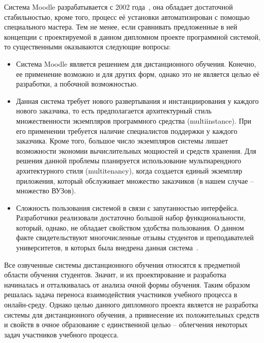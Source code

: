 Система Moodle разрабатывается с 2002 года~\cite{moodle_habr}, она обладает достаточной стабильностью, кроме того, процесс её установки автоматизирован с помощью специального мастера. Тем не менее, если сравнивать предложенные в ней концепции с проектируемой в данном дипломном проекте программной системой, то существенными оказываются следующие вопросы:
\begin{itemize}
	\item Система Moodle является решением для дистанционного обучения. Конечно, ее применение возможно и для других форм, однако это не является целью её разработки, а побочной возможностью.
	\item Данная система требует нового развертывания и инстанциирования у каждого нового заказчика, то есть предполагается архитектурный стиль множественности экземпляров программного средства (multiinstance). При его применении требуется наличие специалистов поддержки у каждого заказчика. Кроме того, большое число экземпляров системы лишает возможности экономии вычислительных мощностей и средств хранения. Для решения данной проблемы планируется использование мультиарендного архитектурного стиля (mul\-ti\-te\-nan\-cy), когда создается единый экземпляр приложения, который обслуживает множество заказчиков (в нашем случае -- множество \mbox{ВУЗов}).
	\item Сложность пользования системой в связи с запутанностью интерфейса. Разработчики реализовали достаточно большой набор функциональности, который, однако, не обладает свойством удобства пользования. О данном факте свидетельствуют многочисленные отзывы студентов и преподавателей университетов, в которых была внедрена данная система~\cite{moodle_habr}.
\end{itemize}

Все озвученные системы дистанционного обучения относятся к предметной области обучения студентов. Значит, и их проектирование и разработка начиналась и отталкивалась от анализа очной формы обучения. Таким образом решалась задача переноса взаимодействия участников учебного процесса в онлайн-среду. Однако целью данного дипломного проекта является не разработка системы для дистанционного обучения, а привнесение их положительных средств и свойств в очное образование с единственной целью -- облегчения некоторых задач участников учебного процесса.

